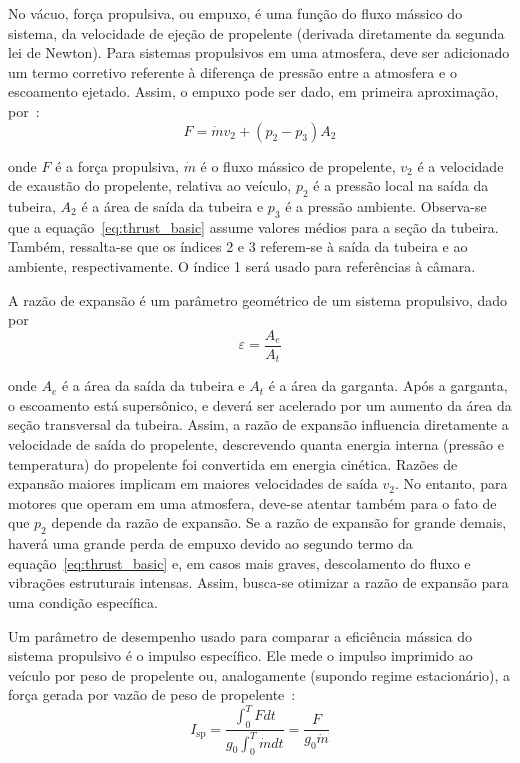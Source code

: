 No vácuo, força propulsiva, ou empuxo, é uma função do fluxo mássico do sistema, da velocidade de ejeção de propelente (derivada diretamente da segunda lei de Newton). Para sistemas propulsivos em uma atmosfera, deve ser adicionado um termo corretivo referente à diferença de pressão entre a atmosfera e o escoamento ejetado. Assim, o empuxo pode ser dado, em primeira aproximação, por~\cite{Sutton}:
\begin{equation}
    \label{eq:thrust_basic}
    F = \dot{m} v_2 + (p_2 - p_3) A_2
\end{equation}

onde \(F\) é a força propulsiva, \(\dot{m}\) é o fluxo mássico de propelente, \(v_2\) é a velocidade de exaustão do propelente, relativa ao veículo, \(p_2\) é a pressão local na saída da tubeira, \(A_2\) é a área de saída da tubeira e \(p_3\) é a pressão ambiente. Observa-se que a equação~\ref{eq:thrust_basic} assume valores médios para a seção da tubeira. Também, ressalta-se que os índices 2 e 3 referem-se à saída da tubeira e ao ambiente, respectivamente. O índice 1 será usado para referências à câmara.

A razão de expansão é um parâmetro geométrico de um sistema propulsivo, dado por
\begin{equation}
    \label{eq:exp_ratio}
    \varepsilon = \frac{A_e}{A_t}
\end{equation}

onde \(A_e\) é a área da saída da tubeira e \(A_t\) é a área da garganta. Após a garganta, o escoamento está supersônico, e deverá ser acelerado por um aumento da área da seção transversal da tubeira. Assim, a razão de expansão influencia diretamente a velocidade de saída do propelente, descrevendo quanta energia interna (pressão e temperatura) do propelente foi convertida em energia cinética. Razões de expansão maiores implicam em maiores velocidades de saída \(v_2\). No entanto, para motores que operam em uma atmosfera, deve-se atentar também para o fato de que \(p_2\) depende da razão de expansão. Se a razão de expansão for grande demais, haverá uma grande perda de empuxo devido ao segundo termo da equação~\ref{eq:thrust_basic} e, em casos mais graves, descolamento do fluxo e vibrações estruturais intensas. Assim, busca-se otimizar a razão de expansão para uma condição específica.

Um parâmetro de desempenho usado para comparar a eficiência mássica do sistema propulsivo é o impulso específico. Ele mede o impulso imprimido ao veículo por peso de propelente ou, analogamente (supondo regime estacionário), a força gerada por vazão de peso de propelente~\cite{Sutton}:
\begin{equation}
    \label{eq:Isp}
    I_{\text{sp}} = \frac{\int^T_0 F dt}{g_0 \int^T_0 \dot{m}dt} = \frac{F}{g_0 \dot{m}}
\end{equation}

